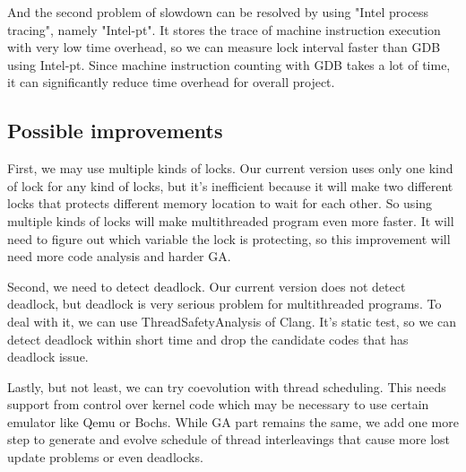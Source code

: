 And the second problem of slowdown can be resolved by using "Intel process tracing", namely "Intel-pt". It stores the trace of machine instruction execution with very low time overhead, so we can measure lock interval faster than GDB using Intel-pt. Since machine instruction counting with GDB takes a lot of time, it can significantly reduce time overhead for overall project.

\subsection{Possible improvements}
First, we may use multiple kinds of locks. Our current version uses only one kind of lock for any kind of locks, but it's inefficient because it will make two different locks that protects different memory location to wait for each other. So using multiple kinds of locks will make multithreaded program even more faster. It will need to figure out which variable the lock is protecting, so this improvement will need more code analysis and harder GA.

Second, we need to detect deadlock. Our current version does not detect deadlock, but deadlock is very serious problem for multithreaded programs. To deal with it, we can use ThreadSafetyAnalysis of Clang. It's static test, so we can detect deadlock within short time and drop the candidate codes that has deadlock issue.

Lastly, but not least, we can try coevolution with thread scheduling. This needs support from control over kernel code which may be necessary to use certain emulator like Qemu or Bochs. While GA part remains the same, we add one more step to generate and evolve schedule of thread interleavings that cause more lost update problems or even deadlocks.
